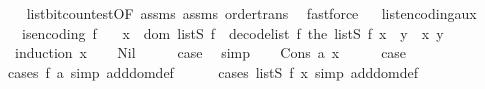 \begin{isabellebody}
%
\isadelimproof
\ \ %
\endisadelimproof
%
\isatagproof
{}\isamarkupfalse%
\ list{\isacharunderscore}{\kern0pt}bit{\isacharunderscore}{\kern0pt}count{\isacharunderscore}{\kern0pt}est{\isacharbrackleft}{\kern0pt}OF\ assms{\isacharparenleft}{\kern0pt}{}{\isacharparenright}{\kern0pt}{\isacharbrackright}{\kern0pt}\ assms{\isacharparenleft}{\kern0pt}{}{\isacharparenright}{\kern0pt}\ order{\isacharunderscore}{\kern0pt}trans\ \isamarkupfalse%
\ fastforce%
\endisatagproof
{\isafoldproof}%
%
\isadelimproof
\ \isanewline
%
\endisadelimproof
\isanewline
{}\isamarkupfalse%
\ list{\isacharunderscore}{\kern0pt}encoding{\isacharunderscore}{\kern0pt}aux{\isacharcolon}{\kern0pt}\isanewline
\ \ \ {\isachardoublequoteopen}is{\isacharunderscore}{\kern0pt}encoding\ f{\isachardoublequoteclose}\isanewline
\ \ \ {\isachardoublequoteopen}x\ {\isasymin}\ dom\ {\isacharparenleft}{\kern0pt}list\isactrlsub S\ f{\isacharparenright}{\kern0pt}\ {\isasymLongrightarrow}\ decode{\isacharunderscore}{\kern0pt}list\ f\ {\isacharparenleft}{\kern0pt}the\ {\isacharparenleft}{\kern0pt}list\isactrlsub S\ f\ x{\isacharparenright}{\kern0pt}\ {\isacharat}{\kern0pt}\ y{\isacharparenright}{\kern0pt}\ {\isacharequal}{\kern0pt}\ {\isacharparenleft}{\kern0pt}x{\isacharcomma}{\kern0pt}\ y{\isacharparenright}{\kern0pt}{\isachardoublequoteclose}\isanewline
%
\isadelimproof
%
\endisadelimproof
%
\isatagproof
{}\isamarkupfalse%
\ \ {\isacharparenleft}{\kern0pt}induction\ x{\isacharparenright}{\kern0pt}\isanewline
\ \ \isamarkupfalse%
\ Nil\isanewline
\ \ \isamarkupfalse%
\ \isamarkupfalse%
\ {\isacharquery}{\kern0pt}case\ \isamarkupfalse%
\ simp\isanewline
{}\isamarkupfalse%
\isanewline
\ \ \isamarkupfalse%
\ {\isacharparenleft}{\kern0pt}Cons\ a\ x{\isacharparenright}{\kern0pt}\isanewline
\ \ \isamarkupfalse%
\ \isamarkupfalse%
\ {\isacharquery}{\kern0pt}case\isanewline
\ \ \ \ \isamarkupfalse%
\ {\isacharparenleft}{\kern0pt}cases\ {\isachardoublequoteopen}f\ a{\isachardoublequoteclose}{\isacharcomma}{\kern0pt}\ simp\ add{\isacharcolon}{\kern0pt}dom{\isacharunderscore}{\kern0pt}def{\isacharparenright}{\kern0pt}\isanewline
\ \ \ \ \isamarkupfalse%
\ {\isacharparenleft}{\kern0pt}cases\ {\isachardoublequoteopen}list\isactrlsub S\ f\ x{\isachardoublequoteclose}{\isacharcomma}{\kern0pt}\ simp\ add{\isacharcolon}{\kern0pt}dom{\isacharunderscore}{\kern0pt}def{\isacharparenright}{\kern0pt}\isanewline

\end{isabellebody}

